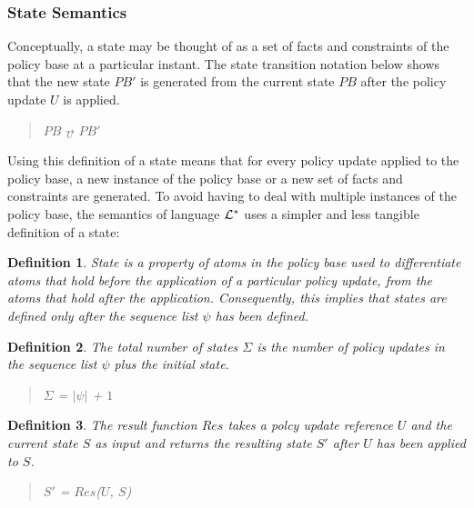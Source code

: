 \documentclass[10pt, twocolumn]{article}
\newtheorem{definition}{Definition}
\begin{document}
      \subsubsection{State Semantics}

        Conceptually, a state may be thought of as a set of facts and
        constraints of the policy base at a particular instant. The state
        transition notation below shows that the new state $PB'$ is generated
        from the current state $PB$ after the policy update $U$ is applied.

        \begin{quote}
          $PB$ $\overrightarrow{_{U}}$ $PB'$
        \end{quote}

        Using this definition of a state means that for every policy update
        applied to the policy base, a new instance of the policy base or a new 
        set of facts and constraints are generated. To avoid having to deal
        with multiple instances of the policy base, the semantics of language
        ${\cal L}^{*}$ uses a simpler and less tangible definition of a state:

        \begin{definition}
          State is a property of atoms in the policy base used to differentiate
          atoms that hold before the application of a particular policy update,
          from the atoms that hold after the application. Consequently, this
          implies that states are defined only after the sequence list $\psi$
          has been defined.
        \end{definition}

        \begin{definition}
          The total number of states $\Sigma$ is the number of policy updates
          in the sequence list $\psi$ plus the initial state.
          \begin{quote}
            $\Sigma$ = $|\psi|$ + $1$
          \end{quote}
        \end{definition}

        \begin{definition}
          The result function $Res$ takes a polcy update reference $U$ and
          the current state $S$ as input and returns the resulting state $S'$
          after $U$ has been applied to $S$.

          \begin{quote}
            $S'$ = $Res$($U$, $S$)
          \end{quote}
        \end{definition}
\end{document}
